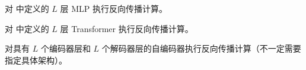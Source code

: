 \documentclass[../../book-main_zh.tex]{subfiles}
\begin{document}
\begin{exercise}
    对  中定义的 \(L\) 层 MLP 执行反向传播计算。
\end{exercise}

\begin{exercise}
    对  中定义的 \(L\) 层 Transformer 执行反向传播计算。
\end{exercise}

\begin{exercise}
    对具有 \(L\) 个编码器层和 \(L\) 个解码器层的自编码器执行反向传播计算（不一定需要指定具体架构）。
\end{exercise}
\end{document}
